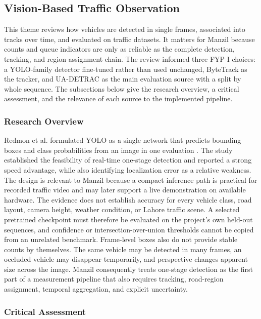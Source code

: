 \subsection{Vision-Based Traffic Observation}

This theme reviews how vehicles are detected in single frames, associated into tracks over time, and evaluated on traffic datasets. It matters for Manzil because counts and queue indicators are only as reliable as the complete detection, tracking, and region-assignment chain. The review informed three FYP-I choices: a YOLO-family detector fine-tuned rather than used unchanged, ByteTrack as the tracker, and UA-DETRAC as the main evaluation source with a split by whole sequence. The subsections below give the research overview, a critical assessment, and the relevance of each source to the implemented pipeline.

\subsubsection{Research Overview}

Redmon et al. formulated YOLO as a single network that predicts bounding boxes and class probabilities from an image in one evaluation \cite{redmon2016yolo}. The study established the feasibility of real-time one-stage detection and reported a strong speed advantage, while also identifying localization error as a relative weakness. The design is relevant to Manzil because a compact inference path is practical for recorded traffic video and may later support a live demonstration on available hardware. The evidence does not establish accuracy for every vehicle class, road layout, camera height, weather condition, or Lahore traffic scene. A selected pretrained checkpoint must therefore be evaluated on the project's own held-out sequences, and confidence or intersection-over-union thresholds cannot be copied from an unrelated benchmark. Frame-level boxes also do not provide stable counts by themselves. The same vehicle may be detected in many frames, an occluded vehicle may disappear temporarily, and perspective changes apparent size across the image. Manzil consequently treats one-stage detection as the first part of a measurement pipeline that also requires tracking, road-region assignment, temporal aggregation, and explicit uncertainty.

\subsubsection{Critical Assessment}

